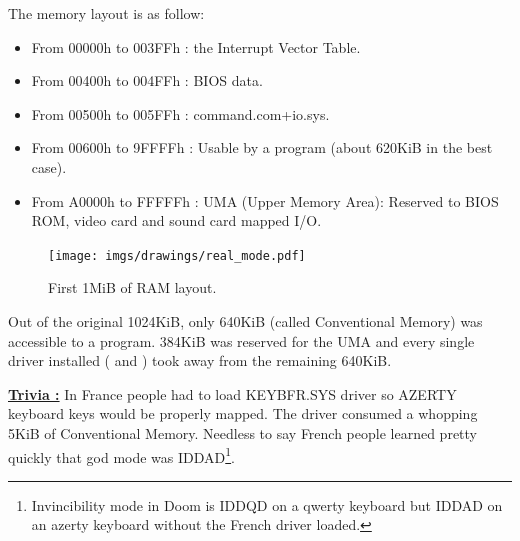 \documentclass[book.tex]{subfiles}
\begin{document}
  \bigskip
The memory layout is as follow:\\
\begin{itemize}
\item From 00000h to 003FFh : the Interrupt Vector Table.
\item From 00400h to 004FFh : BIOS data.
\item From 00500h to 005FFh : command.com+io.sys.
\item From 00600h to 9FFFFh : Usable by a program (about 620KiB in the best case). 
\item From A0000h to FFFFFh : UMA (Upper Memory Area): Reserved to BIOS ROM, video card and sound card mapped I/O.
\end{itemize}

\begin{figure}[H]
\centering
\texttt{[image: imgs/drawings/real\_mode.pdf]}

\caption{First 1MiB of RAM layout.}
\label{fig:fp_internals}
\end{figure}


Out of the original 1024KiB, only 640KiB (called Conventional Memory) was accessible to a program. 384KiB was reserved for the UMA and every single driver installed ( and ) took away from the remaining 640KiB.

\bigskip

\textbf{\underline{Trivia :}}  In France people had to load KEYBFR.SYS driver so AZERTY keyboard keys would be properly mapped. The driver consumed a whopping 5KiB of Conventional Memory. Needless to say French people learned pretty quickly that god mode was IDDAD\footnote{Invincibility mode in Doom is IDDQD on a qwerty keyboard but IDDAD on an azerty keyboard without the French driver loaded.}.\\
\par
\end{document}
